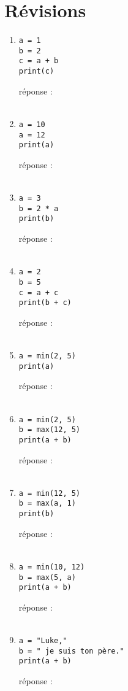 \documentclass[12pt,a4paper]{article}
\newcommand{\codeintext}[1]{\texttt{#1}}
\newcommand{\response}{réponse : \hrulefill\\\\}
\begin{document}
\section*{Révisions}


\begin{enumerate}

\item
\begin{lstlisting}
a = 1
b = 2
c = a + b
print(c)
\end{lstlisting}
\response %

\item
\begin{lstlisting}
a = 10
a = 12
print(a)
\end{lstlisting}
\response %

\item
\begin{lstlisting}
a = 3
b = 2 * a
print(b)
\end{lstlisting} 
\response %

\item
\begin{lstlisting}
a = 2
b = 5
c = a + c
print(b + c)
\end{lstlisting}
\response %

\item
\begin{lstlisting}
a = min(2, 5)
print(a)
\end{lstlisting}
\response %
\pagebreak

\item
\begin{lstlisting}
a = min(2, 5)
b = max(12, 5)
print(a + b)
\end{lstlisting}
\response %

\item
\begin{lstlisting}
a = min(12, 5)
b = max(a, 1)
print(b)
\end{lstlisting}
\response %

\item
\begin{lstlisting}
a = min(10, 12)
b = max(5, a)
print(a + b)
\end{lstlisting}
\response %

\item
\begin{lstlisting}
a = "Luke,"
b = " je suis ton père."
print(a + b)
\end{lstlisting}
\response %


\end{enumerate}
\end{document}
